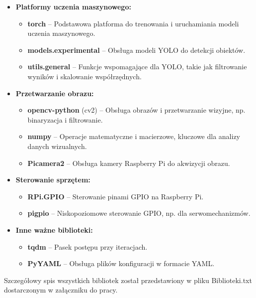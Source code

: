 \documentclass[a4paper,twoside,12pt]{book}
\begin{document}
\begin{itemize}
    \item \textbf{Platformy uczenia maszynowego:}
    \begin{itemize}
        \item \textbf{torch} – Podstawowa platforma do trenowania i uruchamiania modeli uczenia maszynowego.
        \item \textbf{models.experimental} – Obsługa modeli YOLO do detekcji obiektów.
        \item \textbf{utils.general} – Funkcje wspomagające dla YOLO, takie jak filtrowanie wyników i skalowanie współrzędnych.
    \end{itemize}
    
    \item \textbf{Przetwarzanie obrazu:}
    \begin{itemize}
        \item \textbf{opencv-python} (cv2) – Obsługa obrazów i przetwarzanie wizyjne, np. binaryzacja i filtrowanie.
        \item \textbf{numpy} – Operacje matematyczne i macierzowe, kluczowe dla analizy danych wizualnych.
        \item \textbf{Picamera2} – Obsługa kamery Raspberry Pi do akwizycji obrazu.
    \end{itemize}
    \item \textbf{Sterowanie sprzętem:}
    \begin{itemize}
        \item \textbf{RPi.GPIO} – Sterowanie pinami GPIO na Raspberry Pi.
        \item \textbf{pigpio} – Niskopoziomowe sterowanie GPIO, np. dla serwomechanizmów.
    \end{itemize}
    
    \item \textbf{Inne ważne biblioteki:}
    \begin{itemize}
        \item \textbf{tqdm} – Pasek postępu przy iteracjach.
        \item \textbf{PyYAML} – Obsługa plików konfiguracji w formacie YAML.
    \end{itemize}
\end{itemize}

Szczegółowy spis wszystkich bibliotek został przedstawiony w pliku Biblioteki.txt dostarczonym w załączniku do pracy.
\end{document}
